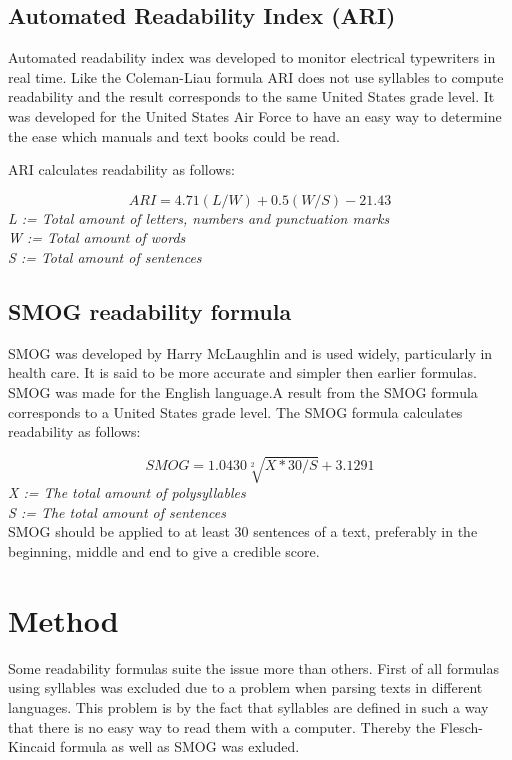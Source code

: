 \documentclass[a4paper]{article}
\begin{document}
\subsection{Automated Readability Index (ARI)}
Automated readability index was developed to monitor electrical typewriters in real time. Like the Coleman-Liau formula ARI does not use syllables to compute readability and the result corresponds to the same United States grade level\cite{senter67}. It was developed for the United States Air Force to have an easy way to determine the ease which manuals and text books could be read\cite{senter67}.

ARI calculates readability as follows:

\begin{equation}
ARI = 4.71(L/W) + 0.5(W/S) - 21.43
\end{equation}
\emph{L := Total amount of letters, numbers and punctuation marks}\\
\emph{W := Total amount of words}\\
\emph{S := Total amount of sentences}\\

\subsection{SMOG readability formula}

SMOG was developed by Harry McLaughlin and is used widely, particularly in health care\cite{ley96}. It is said to be more accurate and simpler then earlier formulas\cite{laughlin69}. SMOG was made for the English language.A result from the SMOG formula corresponds to a United States grade level.
 The SMOG formula calculates readability as follows:

\begin{equation}
    SMOG = 1.0430\sqrt[2]{X*30/S}+3.1291
\end{equation}
\emph{X := The total amount of polysyllables}\\
\emph{S := The total amount of sentences}\\

SMOG should be applied to at least 30 sentences of a text, preferably in the beginning, middle and end to give a credible score\cite{laughlin69}.

\section{Method}
Some readability formulas suite the issue more than others. First of all formulas using syllables was excluded due to a problem when parsing texts in different languages. This problem is by the fact that syllables are defined in such a way that there is no easy way to read them with a computer\cite{coleman75}. Thereby the Flesch-Kincaid formula as well as SMOG was exluded. 
\end{document}
